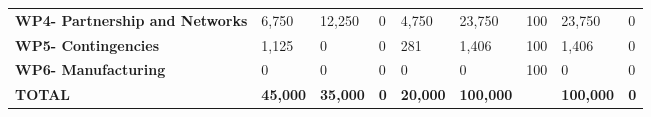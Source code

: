 \begin{landscape}
\begin{table}[H]
{\begin{tabular}{p{5cm}p{2cm}p{2cm}p{2.5cm}p{2cm}p{2cm}p{2cm}p{2cm}p{2cm}}
    \textbf{WP4- Partnership and Networks} & 6,750                                                                  & 12,250                                                             &0                                                                                 & 4,750                                                                        & 23,750                                                                                        & 100                        & 23,750                          & 0                                                                         \\
    \textbf{WP5- Contingencies}                                                        & 1,125                                                                  & 0                                                                  &0                                                                                 & 281                                                                          & 1,406                                                                                         & 100                        & 1,406                           & 0                                                                         \\
    \textbf{WP6- Manufacturing}                                                        & 0                                                                      & 0                                                                  &0                                                                                 & 0                                                                            & 0                                                                                             & 100                       & 0                               & 0                                                                         \\ \hline
    \textbf{TOTAL}                                                                     & \textbf{45,000}                                                        & \textbf{35,000}                                                    & \textbf{0}                                                                      & \textbf{20,000}                                                              & \textbf{100,000}                                                                              & \textbf{}                    & \textbf{100,000}                & \textbf{0}                                                               
     \\ \bottomrule[2pt]
    \end{tabular} }
    \end{table}



\end{landscape}

